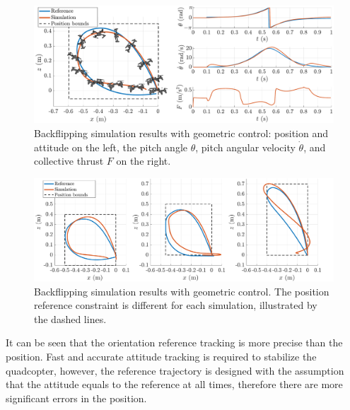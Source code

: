 \begin{figure}
    \centering
    \includegraphics[width=\linewidth]{Fig/geomsimu.pdf}
    \caption[Backflipping simulation results with geometric control]{Backflipping simulation results with geometric control: position and attitude on the left, the pitch angle $\theta$, pitch angular velocity $\dot{\theta}$, and collective thrust $F$ on the right.}\label{fig:geomsimu}
    \end{figure}

\begin{figure}
    \centering
    \includegraphics[width=\linewidth]{Fig/geomsimu2.pdf}
    \caption[Backflipping simulation results with geometric control: the effect of position constraints]{Backflipping simulation results with geometric control. The position reference constraint is different for each simulation, illustrated by the dashed lines.}\label{fig:geomsimu2}
\end{figure}
 
 It can be seen that the orientation reference tracking is more precise than the position. Fast and accurate attitude tracking is required to stabilize the quadcopter, however, the reference trajectory is designed with the assumption that the attitude equals to the reference at all times, therefore there are more significant errors in the position.
 
 
